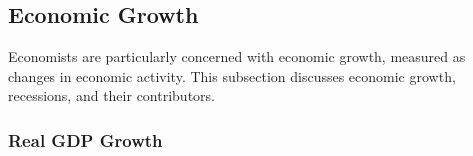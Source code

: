 \subsection*{Economic Growth}
\begin{minipage}{0.76\textwidth} 
\small Economists are particularly concerned with economic growth, measured as changes in economic activity. This subsection discusses economic growth, recessions, and their contributors.
\end{minipage}
\vspace{-2mm}
\subsubsection*{Real GDP Growth}
\begin{minipage}{0.76\textwidth}
\vspace{-1mm}

\small  
\end{minipage}

